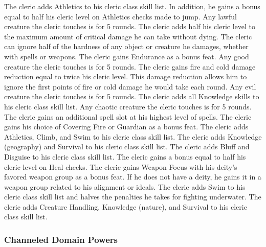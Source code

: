  The cleric adds Athletics to his cleric class skill list. In addition, he gains a bonus equal to half his cleric level on Athletics checks made to jump.
 Any lawful creature the cleric touches is \bewildered for 5 rounds.
 The cleric adds half his cleric level to the maximum amount of critical damage he can take without dying.
 The cleric can ignore half of the hardness of any object or creature he damages, whether with spells or weapons.
 The cleric gains Endurance as a bonus feat.
 Any good creature the cleric touches is \sickened for 5 rounds.
 The cleric gains fire and cold damage reduction equal to twice his cleric level. This damage reduction allows him to ignore the first points of fire or cold damage he would take each round.
 Any evil creature the cleric touches is \shaken for 5 rounds.
 The cleric adds all Knowledge skills to his cleric class skill list.
 Any chaotic creature the cleric touches is \vulnerable for 5 rounds.
 The cleric gains an additional spell slot at his highest level of spells.
 The cleric gains his choice of Covering Fire or Guardian as a bonus feat.
 The cleric adds Athletics, Climb, and Swim to his cleric class skill list.
 The cleric adds Knowledge (geography) and Survival to his cleric class skill list.
 The cleric adds Bluff and Disguise to his cleric class skill list.
 The cleric gains a bonus equal to half his cleric level on Heal checks.
 The cleric gains Weapon Focus with his deity's favored weapon group as a bonus feat. If he does not have a deity, he gains it in a weapon group related to his alignment or ideals.
 The cleric adds Swim to his cleric class skill list and halves the penalties he takes for fighting underwater.
 The cleric adds Creature Handling, Knowledge (nature), and Survival to his cleric class skill list.

\subsubsection{Channeled Domain Powers}\label{Channeled Domain Powers}

